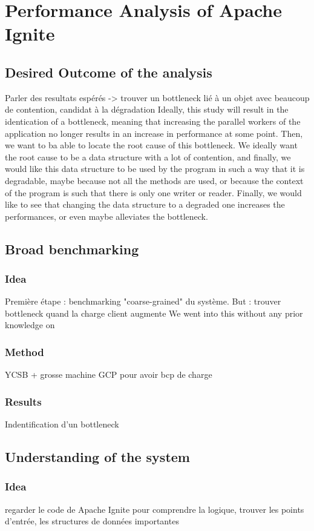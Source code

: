 \documentclass[conference]{IEEEtran}
\begin{document}
\section{Performance Analysis of Apache Ignite}
\subsection{Desired Outcome of the analysis}
Parler des resultats espérés -> trouver un bottleneck lié à un objet avec beaucoup de contention, candidat à la dégradation
Ideally, this study will result in the identication of a bottleneck, meaning that increasing the parallel workers of the application no longer results in an increase in performance at some point. Then, we want to ba able to locate the root cause of this bottleneck. We ideally want the root cause to be a data structure with a lot of contention, and finally, we would like this data structure to be used by the program in such a way that it is degradable, maybe because not all the methods are used, or because the context of the program is such that there is only one writer or reader. Finally, we would like to see that changing the data structure to a degraded one increases the performances, or even maybe alleviates the bottleneck.

\subsection{Broad benchmarking}
\subsubsection{Idea}
Première étape : benchmarking "coarse-grained" du système.
But : trouver bottleneck quand la charge client augmente 
We went into this without any prior knowledge on 
\subsubsection{Method}
YCSB + grosse machine GCP pour avoir bcp de charge
\subsubsection{Results}
Indentification d'un bottleneck

\subsection{Understanding of the system}
\subsubsection{Idea}
regarder le code de Apache Ignite pour comprendre la logique, trouver les points d'entrée, les structures de données importantes
\end{document}
